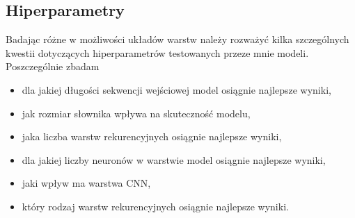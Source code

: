 \subsection{Hiperparametry}
Badając różne w możliwości układów warstw należy rozważyć kilka szczególnych kwestii dotyczących hiperparametrów testowanych przeze mnie modeli. 
Poszczególnie zbadam 
\begin{itemize}
    \item dla jakiej długości sekwencji wejściowej model osiągnie najlepsze wyniki,
    \item jak rozmiar słownika wpływa na skuteczność modelu, 
    \item jaka liczba warstw rekurencyjnych osiągnie najlepsze wyniki,
    \item dla jakiej liczby neuronów w warstwie model osiągnie najlepsze wyniki, 
    \item jaki wpływ ma warstwa CNN, 
    \item który rodzaj warstw rekurencyjnych osiągnie najlepsze wyniki.
\end{itemize}
